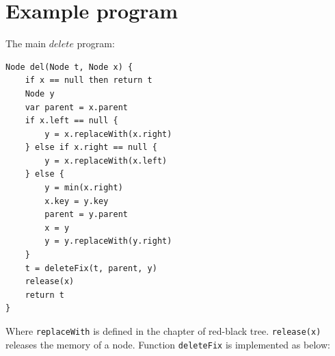 \documentclass[b5paper]{article}
\begin{document}

\section{Example program}

The main $delete$ program:

\begin{lstlisting}[language = Bourbaki]
Node del(Node t, Node x) {
    if x == null then return t
    Node y
    var parent = x.parent
    if x.left == null {
        y = x.replaceWith(x.right)
    } else if x.right == null {
        y = x.replaceWith(x.left)
    } else {
        y = min(x.right)
        x.key = y.key
        parent = y.parent
        x = y
        y = y.replaceWith(y.right)
    }
    t = deleteFix(t, parent, y)
    release(x)
    return t
}
\end{lstlisting}

Where \texttt{replaceWith} is defined in the chapter of red-black tree. \texttt{release(x)} releases the memory of a node. Function \texttt{deleteFix} is implemented as below:
\end{document}
